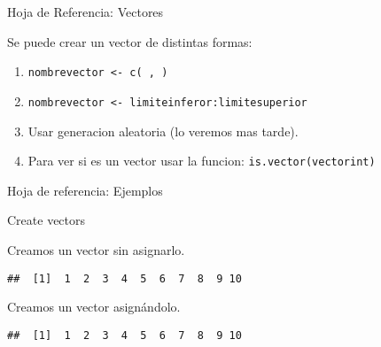 \begin{frame}{Hoja de Referencia: Vectores}

Se puede crear un vector de distintas formas:

\begin{enumerate}
\tightlist
\item
  \texttt{nombrevector <- c( , )}
\item
  \texttt{nombrevector <- limiteinferor:limitesuperior}
\item
  Usar generacion aleatoria (lo veremos mas tarde).
\item
  Para ver si es un vector usar la funcion:
  \texttt{is.vector(vectorint)}
\end{enumerate}
\end{frame}

\begin{frame}[fragile]{Hoja de referencia: Ejemplos}

\begin{block}{Create vectors}

Creamos un vector sin asignarlo.

\begin{Shaded}
\begin{Highlighting}[]
\SpecialCharTok{:}
\end{Highlighting}
\end{Shaded}

\begin{verbatim}
##  [1]  1  2  3  4  5  6  7  8  9 10
\end{verbatim}

Creamos un vector asignándolo.

\begin{Shaded}
\begin{Highlighting}[]
\OtherTok{\textless{}{-}}\SpecialCharTok{:}

\end{Highlighting}
\end{Shaded}

\begin{verbatim}
##  [1]  1  2  3  4  5  6  7  8  9 10
\end{verbatim}
\end{block}
\end{frame}

